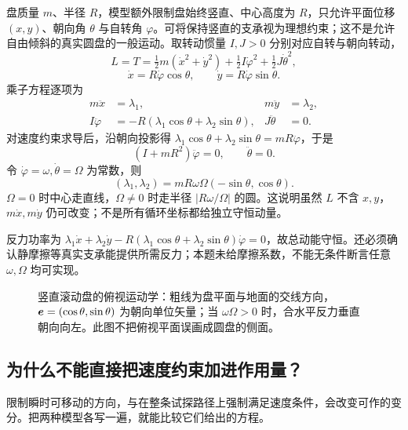 \begin{example}[保持竖直的理想滚动盘]
盘质量 $m$、半径 $R$，模型额外限制盘始终竖直、中心高度为 $R$，只允许平面位移 $(x,y)$、朝向角 $\theta$ 与自转角 $\varphi$。可将保持竖直的支承视为理想约束；这不是允许自由倾斜的真实圆盘的一般运动。取转动惯量 $I,J>0$ 分别对应自转与朝向转动，
\[
L=T=\tfrac12m(\dot x^2+\dot y^2)+\tfrac12I\dot\varphi^2+\tfrac12J\dot\theta^2,
\]
\[
\dot x=R\dot\varphi\cos\theta,\qquad
\dot y=R\dot\varphi\sin\theta.
\]
乘子方程逐项为
\begin{align}
m\ddot x&=\lambda_1,& m\ddot y&=\lambda_2,\\
I\ddot\varphi&=-R(\lambda_1\cos\theta+\lambda_2\sin\theta),&
J\ddot\theta&=0.
\end{align}
对速度约束求导后，沿朝向投影得 $\lambda_1\cos\theta+\lambda_2\sin\theta=mR\ddot\varphi$，于是
\[
(I+mR^2)\ddot\varphi=0,\qquad \ddot\theta=0.
\]
令 $\dot\varphi=\omega,\dot\theta=\Omega$ 为常数，则
\[
(\lambda_1,\lambda_2)=mR\omega\Omega(-\sin\theta,\cos\theta).
\]
$\Omega=0$ 时中心走直线，$\Omega\ne0$ 时走半径 $|R\omega/\Omega|$ 的圆。这说明虽然 $L$ 不含 $x,y$，$m\dot x,m\dot y$ 仍可改变；不是所有循环坐标都给独立守恒动量。

反力功率为 $\lambda_1\dot x+\lambda_2\dot y-R(\lambda_1\cos\theta+\lambda_2\sin\theta)\dot\varphi=0$，故总动能守恒。还必须确认静摩擦等真实支承能提供所需反力；本题未给摩擦系数，不能无条件断言任意 $\omega,\Omega$ 均可实现。
\end{example}
\begin{figure}[htbp]
\centering
{}
\caption{竖直滚动盘的俯视运动学：粗线为盘平面与地面的交线方向，$\boldsymbol{e}=(\cos\theta,\sin\theta)$ 为朝向单位矢量；当 $\omega\Omega>0$ 时，合水平反力垂直朝向向左。此图不把俯视平面误画成圆盘的侧面。}
\label{fig:rolling-disk}
\end{figure}

\subsection{为什么不能直接把速度约束加进作用量？}
限制瞬时可移动的方向，与在整条试探路径上强制满足速度条件，会改变可作的变分。把两种模型各写一遍，就能比较它们给出的方程。

